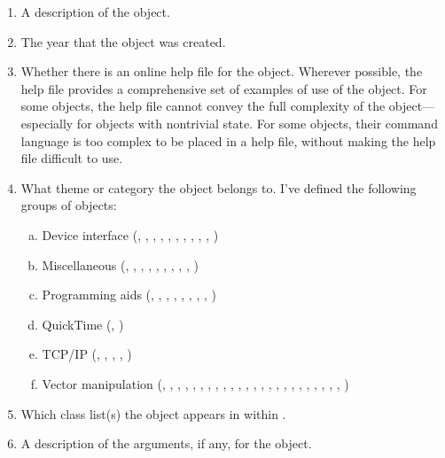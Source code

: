 \begin{enumerate}[  1)]
\item A description of the object.
\item The year that the object was created.
\item Whether there is an online help file for the object.
Wherever possible, the help file provides a comprehensive set of examples of use of the object.
For some objects, the help file cannot convey the full complexity of the object---especially for objects with nontrivial state.
For some objects, their command language is too complex to be placed in a help file, without making the help file difficult to use.
\item What theme or category the object belongs to.
I've defined the following groups of objects:
  \begin{enumerate}[a)]
  \item Device interface (, , , , , ,
    , , , , )
  \item Miscellaneous (, , , , ,
    , , , , )
  \item Programming aids (, , , , ,
    , , , )
  \item QuickTime\texttrademark{} (, )
  \item TCP/IP (, , , , )
  \item Vector manipulation (, , , , ,
    , , , , , , ,
    , , , , , ,
    , , , , , , )
  \end{enumerate}
\item Which class list(s) the object appears in within \MaxName.
\item A description of the arguments, if any, for the object.

\end{enumerate}
